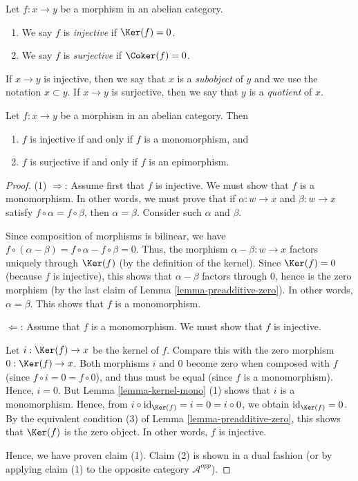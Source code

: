\begin{definition}
\label{definition-injective-surjective}
Let $f : x \to y$ be a morphism in an abelian category.
\begin{enumerate}
\item We say $f$ is {\it injective} if $\Ker(f) = 0$.
\item We say $f$ is {\it surjective} if $\Coker(f) = 0$.
\end{enumerate}
If $x \to y$ is injective, then we say that $x$ is a {\it subobject}
of $y$ and we use the notation $x \subset y$. If $x \to y$ is
surjective, then we say that $y$ is a {\it quotient} of $x$.
\end{definition}

\begin{lemma}
\label{lemma-characterize-injective}
Let $f : x \to y$ be a morphism in an abelian category. Then
\begin{enumerate}
\item $f$ is injective if and only if $f$ is a monomorphism, and
\item $f$ is surjective if and only if $f$ is an epimorphism.
\end{enumerate}
\end{lemma}

\begin{proof}
(1) $\Rightarrow$:
Assume first that $f$ is injective.
We must show that $f$ is a monomorphism.
In other words, we must prove that if $\alpha : w \to x$
and $\beta : w \to x$ satisfy $f \circ \alpha = f \circ \beta$,
then $\alpha = \beta$.
Consider such $\alpha$ and $\beta$.

Since composition of morphisms is bilinear, we have
$f \circ \left(\alpha - \beta\right)
= f \circ \alpha - f \circ \beta = 0$.
Thus, the morphism $\alpha - \beta : w \to x$ factors
uniquely through $\Ker(f)$ (by the definition of the kernel).
Since $\Ker(f) = 0$ (because $f$ is injective), this shows
that $\alpha - \beta$ factors through $0$, hence is the
zero morphism (by the last claim of
Lemma \ref{lemma-preadditive-zero}).
In other words, $\alpha = \beta$.
This shows that $f$ is a monomorphism.

$\Leftarrow$:
Assume that $f$ is a monomorphism.
We must show that $f$ is injective.

Let $i : \Ker(f) \to x$ be the kernel of $f$.
Compare this with the zero morphism $0 : \Ker(f) \to x$.
Both morphisms $i$ and $0$ become zero when composed
with $f$ (since $f \circ i = 0 = f \circ 0$), and thus
must be equal (since $f$ is a monomorphism).
Hence, $i = 0$.
But Lemma \ref{lemma-kernel-mono} (1) shows that
$i$ is a monomorphism.
Hence, from $i \circ \text{id}_{\Ker(f)} = i = 0
= i \circ 0$, we obtain $\text{id}_{\Ker(f)} = 0$.
By the equivalent condition (3) of
Lemma \ref{lemma-preadditive-zero}, this shows that
$\Ker(f)$ is the zero object.
In other words, $f$ is injective.

Hence, we have proven claim (1).
Claim (2) is shown in a dual fashion (or by applying
claim (1) to the opposite category
$\mathcal{A}^{opp}$).
\end{proof}

